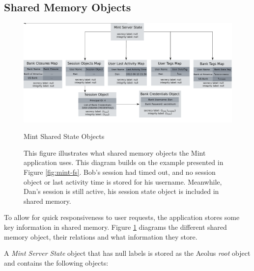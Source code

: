 \subsection{Shared Memory Objects}
\label{sec:mint-smo}

\begin{figure}[h]
\centering
\includegraphics[width=\textwidth,height=\textheight,keepaspectratio]{figures/mint-shared-state}
\caption*{Mint Shared State Objects}
\caption[Mint Shared State Objects]{This figure illustrates what shared memory objects the Mint application uses. This diagram builds on the example presented in Figure \ref{fig:mint-fs}. Bob's session had timed out, and no session object or last activity time is stored for his username. Meanwhile, Dan's session is still active, his session state object is included in shared memory.}
\label{fig:mint-ss}
\end{figure}

To allow for quick responsiveness to user requests, the application stores some key information in shared memory. Figure \ref{fig:mint-ss} diagrams the different shared memory object, their relations and what information they store.

A \emph{Mint Server State} object that has null labels is stored as the Aeolus \emph{root} object and contains the following objects:

